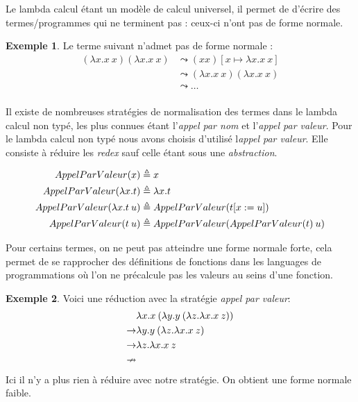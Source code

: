 \documentclass {article}
\theoremstyle{definition}
\newtheorem{example}{Exemple}
\theoremstyle{remark}
\begin{document}
Le lambda calcul étant un modèle de calcul universel, il permet de 
d'écrire des termes/programmes qui ne terminent pas : ceux-ci n'ont pas 
de forme normale. 

\begin{example}
 
  Le terme suivant n'admet pas de forme normale :
  \begin{align*}
  (\lambda x. x\: x) (\lambda x. x\: x) &\leadsto (x x)[x \mapsto \lambda x. x\: x] \\
                                        &\leadsto (\lambda x. x\: x) (\lambda x. x\: x) \\
                                        &\leadsto \ldots \\
  \end{align*}
\end{example}

Il existe de nombreuses stratégies de normalisation des termes dans le
lambda calcul non typé, les plus connues étant l'\emph{appel par nom}
et l'\emph{appel par valeur}.  Pour le lambda calcul non typé 
nous avons choisis d'utilisé l\emph{appel par valeur}. Elle consiste à
réduire les \emph{redex} sauf celle étant sous une \emph{abstraction}.

\begin{align*}
  AppelParValeur(x) &\triangleq x \\
  AppelParValeur(\lambda x. t) &\triangleq \lambda x. t \\
  AppelParValeur(\lambda x. t\:u) &\triangleq AppelParValeur(t[x := u]) \\
  AppelParValeur(t\:u) &\triangleq AppelParValeur(AppelParValeur(t)\:u)
\end{align*}

Pour certains termes, on ne peut pas atteindre une forme normale forte, cela
permet de se rapprocher des définitions de fonctions dans les languages de 
programmations où l'on ne précalcule pas les valeurs au seins d'une fonction.

\begin{example}
  Voici une réduction avec la stratégie \emph{appel par valeur}:
  \begin{align*}
    & \lambda x. x\:({\lambda y. y\:({\lambda z. \lambda x. x\:z}})) \\
    \rightarrow & \lambda y. y\:({\lambda z. \lambda x. x\:z})\\
    \rightarrow & \lambda z. \lambda x. x\:z\\
    \nrightarrow & \:
  \end{align*}
  Ici il n'y a plus rien à réduire avec notre stratégie. On obtient une forme normale faible.
\end{example}
\end{document}
